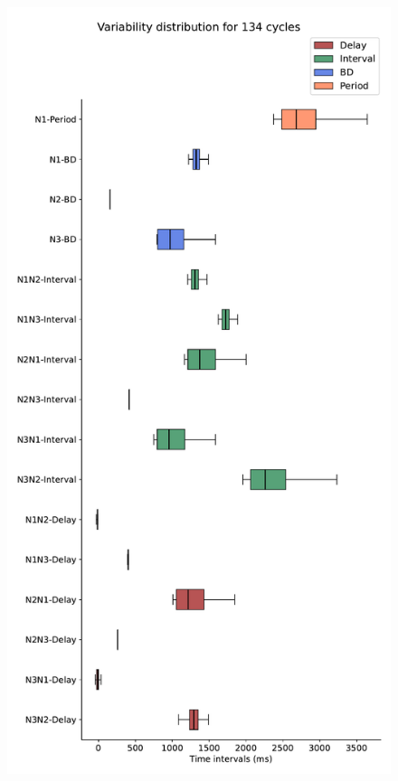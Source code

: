 \begin{figure}[hbt!]
	\begin{minipage}[b]{0.45\textwidth}
		\centering
		\includegraphics[width=\textwidth]{invariants/data/MODEL/n1m_driven/images/3phases/_boxplot.pdf}

\end{minipage}
\end{figure}

